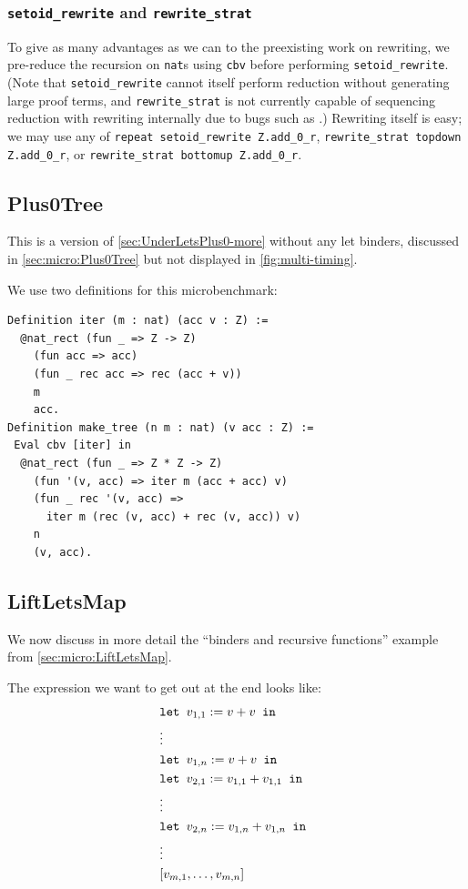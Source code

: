 \begin{subappendices}
\subsubsection{\texorpdfstring{\texttt{setoid\_rewrite}}{setoid\_rewrite} and \texorpdfstring{\texttt{rewrite\_strat}}{rewrite\_strat}}
To give as many advantages as we can to the preexisting work on rewriting, we pre-reduce the recursion on \texttt{nat}s using \texttt{cbv} before performing \texttt{setoid\_rewrite}.
(Note that \texttt{setoid\_rewrite} cannot itself perform reduction without generating large proof terms, and \texttt{rewrite\_strat} is not currently capable of sequencing reduction with rewriting internally due to bugs such as .)
Rewriting itself is easy; we may use any of \texttt{repeat setoid\_rewrite Z.add\_0\_r}, \texttt{rewrite\_strat topdown Z.add\_0\_r}, or \texttt{rewrite\_strat bottomup Z.add\_0\_r}.

\subsection{Plus0Tree}\label{sec:Plus0Tree-more}

This is a version of \autoref{sec:UnderLetsPlus0-more} without any let binders, discussed in \autoref{sec:micro:Plus0Tree} but not displayed in \autoref{fig:multi-timing}.

We use two definitions for this microbenchmark:
\begin{verbatim}
Definition iter (m : nat) (acc v : Z) :=
  @nat_rect (fun _ => Z -> Z)
    (fun acc => acc)
    (fun _ rec acc => rec (acc + v))
    m
    acc.
Definition make_tree (n m : nat) (v acc : Z) :=
 Eval cbv [iter] in
  @nat_rect (fun _ => Z * Z -> Z)
    (fun '(v, acc) => iter m (acc + acc) v)
    (fun _ rec '(v, acc) =>
      iter m (rec (v, acc) + rec (v, acc)) v)
    n
    (v, acc).
\end{verbatim}

\subsection{LiftLetsMap}\label{sec:LiftLetsMap-more}

We now discuss in more detail the ``binders and recursive functions'' example from \autoref{sec:micro:LiftLetsMap}.

The expression we want to get out at the end looks like:
\begin{align*}
    & \letin[{v_{1,1} := v + v}{}] \\
    & \vdots \\
    & \letin[{v_{1,n} := v + v}{}] \\
    & \letin[{v_{2,1} := v_{1,1} + v_{1,1}}{}] \\
    & \vdots \\
    & \letin[{v_{2,n} := v_{1,n} + v_{1,n}}{}] \\
    & \vdots \\
    & [v_{m,1}, \ldots, v_{m,n}]
\end{align*}


\end{subappendices}
